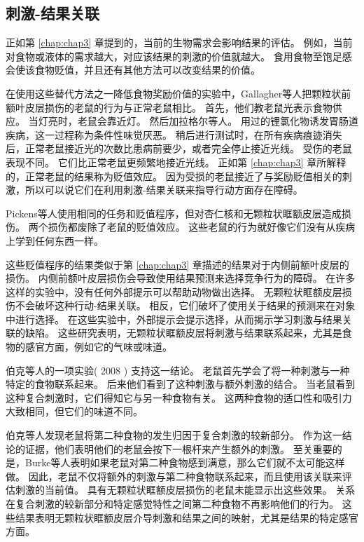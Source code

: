\subsection{刺激-结果关联}

正如第 \ref{chap:chap3} 章提到的，当前的生物需求会影响结果的评估。
例如，当前对食物或液体的需求越大，对应该结果的刺激的价值就越大。
食用食物至饱足感会使该食物贬值，并且还有其他方法可以改变结果的价值。\par


在使用这些替代方法之一降低食物奖励价值的实验中，Gallagher等人\cite{gallagher1999orbitofrontal}把颗粒状前额叶皮层损伤的老鼠的行为与正常老鼠相比。
首先，他们教老鼠光表示食物供应。
当灯亮时，老鼠会靠近灯。
然后加拉格尔等人。
用过的锂氯化物诱发胃肠道疾病，这一过程称为条件性味觉厌恶。
稍后进行测试时，在所有疾病痕迹消失后，正常老鼠接近光的次数比患病前要少，或者完全停止接近光线。
受伤的老鼠表现不同。
它们比正常老鼠更频繁地接近光线。
正如第 \ref{chap:chap3} 章所解释的，正常老鼠的结果称为贬值效应。
因为受损的老鼠接近了与奖励贬值相关的刺激，所以可以说它们在利用刺激-结果关联来指导行动方面存在障碍。\par


Pickens等人\cite{pickens2005orbitofrontal,pickens2003different}使用相同的任务和贬值程序，但对杏仁核和无颗粒状眶额皮层造成损伤。
两个损伤都废除了老鼠的贬值效应。
这些老鼠的行为就好像它们没有从疾病上学到任何东西一样。\par


这些贬值程序的结果类似于第 \ref{chap:chap3} 章描述的结果对于内侧前额叶皮层的损伤。
内侧前额叶皮层损伤会导致使用结果预测来选择竞争行为的障碍。
在许多这样的实验中，没有任何外部提示可以帮助动物做出选择。
无颗粒状眶额皮层损伤不会破坏这种行动-结果关联\cite{ostlund2007orbitofrontal}。
相反，它们破坏了使用关于结果的预测来在对象中进行选择。
在这些实验中，外部提示会提示选择，从而揭示学习刺激与结果关联的缺陷。
这些研究表明，无颗粒状眶额皮层将刺激与结果联系起来，尤其是食物的感官方面，例如它的气味或味道。\par


伯克等人的一项实验( 2008 ) 支持这一结论。
老鼠首先学会了将一种刺激与一种特定的食物联系起来。 后来他们看到了这种刺激与额外刺激的结合。
当老鼠看到这种复合刺激时，它们得知它与另一种食物有关。
这两种食物的适口性和吸引力大致相同，但它们的味道不同。\par


伯克等人发现老鼠将第二种食物的发生归因于复合刺激的较新部分。
作为这一结论的证据，他们表明他们的老鼠会按下一根杆来产生额外的刺激。
至关重要的是，Burke等人表明如果老鼠对第二种食物感到满意，那么它们就不太可能这样做。
因此，老鼠不仅将额外的刺激与第二种食物联系起来，而且使用该关联来评估刺激的当前值。
具有无颗粒状眶额皮层损伤的老鼠未能显示出这些效果。
关系在复合刺激的较新部分和特定感觉特性之间第二种食物不再影响他们的行为。
这些结果表明无颗粒状眶额皮层介导刺激和结果之间的映射，尤其是结果的特定感官方面。\par


